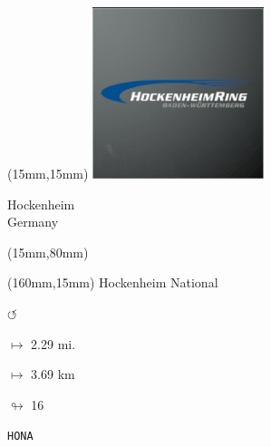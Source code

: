 \begin{textblock*}{50mm}(15mm,15mm)%
\includegraphics[width=50mm]{LG/2015-05-20_00082.png}
\par Hockenheim\\ Germany
\end{textblock*}
\begin{textblock*}{185mm}(15mm,80mm)%
\end{textblock*}
\begin{textblock*}{40mm}(160mm,15mm)%
Hockenheim National
\par \Huge$\circlearrowleft$
\Large
\par$\mapsto$ 2.29 mi.
\par$\mapsto$ 3.69 km
\par$\looparrowright$ 16
\par\hfill\tiny\tt HONA\\
\end{textblock*}
\null\newpage

